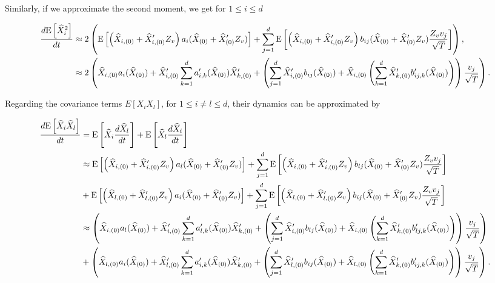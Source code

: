 Similarly, if we approximate the second moment, we get for $1 \le i \le d$
\begin{small}
\begin{align}\label{eq:second_moment_approximation}
\frac{d\mathrm{E}\left[\widehat{X}^2_i\right]}{dt}&\approx 2 \left(\mathrm{E}\left[\left(\widehat{X}_{i,(0)}+\widehat{X}^\prime_{i,(0)} Z_v \right) a_i(\widehat{X}_{(0)}+\widehat{X}^\prime_{(0)} Z_v)\right]+\sum_{j=1}^d \mathrm{E}\left[ \left(\widehat{X}_{i,(0)}+\widehat{X}^\prime_{i,(0)} Z_v \right) b_{ij}(\widehat{X}_{(0)}+\widehat{X}^\prime_{(0)} Z_v)  \frac{Z_v v_j}{\sqrt{T}}\right] \right) , \nonumber\\
&\approx 2 \left( \widehat{X}_{i,(0)} a_i(\widehat{X}_{(0)})+\widehat{X}^\prime_{i,(0)}  \sum_{k=1}^d a_{i,k}^\prime(\widehat{X}_{(0)})\widehat{X}^\prime_{k,(0)}   + \left( \sum_{j=1}^d  \widehat{X}^\prime_{i,(0)} b_{ij}(\widehat{X}_{(0)})+ \widehat{X}_{i,(0)}  \left(\sum_{k=1}^d \widehat{X}^\prime_{k,(0)} b^\prime_{ij,k}(\widehat{X}_{(0)})\right) \right) \frac{ v_j}{\sqrt{T}} \right) .
\end{align}
\end{small}
Regarding the covariance terms $E[X_i X_l]$, for $1 \le i \neq l \le d$, their dynamics can be approximated by
\begin{small}
\begin{align}\label{eq:covariance_dynamcis_approximation}
\frac{d\mathrm{E}\left[\widehat{X}_i \widehat{X}_{l}\right]}{dt}&=\mathrm{E}\left[\widehat{X}_i \frac{d\widehat{X}_l}{dt}\right]+ \mathrm{E}\left[\widehat{X}_l \frac{d\widehat{X}_i}{dt}\right]\nonumber\\
&\approx  \mathrm{E}\left[\left(\widehat{X}_{i,(0)}+\widehat{X}^\prime_{i,(0)} Z_v \right) a_l(\widehat{X}_{(0)}+\widehat{X}^\prime_{(0)} Z_v)\right]+\sum_{j=1}^d \mathrm{E}\left[ \left(\widehat{X}_{i,(0)}+\widehat{X}^\prime_{i,(0)} Z_v \right) b_{lj}(\widehat{X}_{(0)}+\widehat{X}^\prime_{(0)} Z_v)  \frac{Z_v v_j}{\sqrt{T}}\right]  \nonumber\\
&+  \mathrm{E}\left[\left(\widehat{X}_{l,(0)}+\widehat{X}^\prime_{l,(0)} Z_v \right) a_i(\widehat{X}_{(0)}+\widehat{X}^\prime_{(0)} Z_v)\right]+\sum_{j=1}^d \mathrm{E}\left[ \left(\widehat{X}_{l,(0)}+\widehat{X}^\prime_{l,(0)} Z_v \right) b_{ij}(\widehat{X}_{(0)}+\widehat{X}^\prime_{(0)} Z_v)  \frac{Z_v v_j}{\sqrt{T}}\right]  \nonumber\\
&\approx \left( \widehat{X}_{i,(0)} a_l(\widehat{X}_{(0)})+\widehat{X}^\prime_{i,(0)}  \sum_{k=1}^d a_{l,k}^\prime(\widehat{X}_{(0)})\widehat{X}^\prime_{k,(0)}   + \left( \sum_{j=1}^d  \widehat{X}^\prime_{i,(0)} b_{lj}(\widehat{X}_{(0)})+ \widehat{X}_{i,(0)}  \left(\sum_{k=1}^d \widehat{X}^\prime_{k,(0)} b^\prime_{lj,k}(\widehat{X}_{(0)})\right) \right) \frac{ v_j}{\sqrt{T}} \right) \nonumber\\
&+\left( \widehat{X}_{l,(0)} a_i(\widehat{X}_{(0)})+\widehat{X}^\prime_{l,(0)}  \sum_{k=1}^d a_{i,k}^\prime(\widehat{X}_{(0)})\widehat{X}^\prime_{k,(0)}   + \left( \sum_{j=1}^d  \widehat{X}^\prime_{l,(0)} b_{ij}(\widehat{X}_{(0)})+ \widehat{X}_{l,(0)}  \left(\sum_{k=1}^d \widehat{X}^\prime_{k,(0)} b^\prime_{ij,k}(\widehat{X}_{(0)})\right) \right) \frac{ v_j}{\sqrt{T}} \right) .
\end{align}
\end{small}
